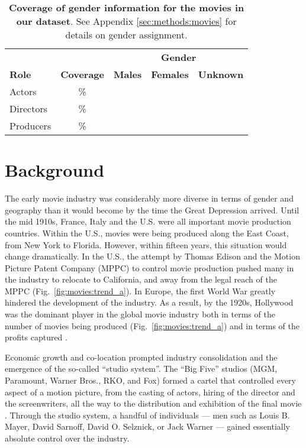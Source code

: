 \begin{table}[t]
\caption[Coverage of gender information for the movies in our dataset.]{\textbf{Coverage of gender information for the movies in our dataset}. See Appendix \ref{sec:methods:movies} for details on gender assignment.}
\label{tab:movies:data}
\begin{tabular}{lcrrr}
 ~   & ~              & \multicolumn{3}{c}{\textbf{Gender}} \\
\cmidrule{3-5}
\textbf{Role} & \textbf{Coverage} & \textbf{Males} & \textbf{Females} & \textbf{Unknown} \\
\midrule
Actors    & \actorCoverage{}\%  & \maleActors{}     & \femaleActors{}     & \naActors{}    \\
Directors & \dirCoverage{}\%    & \maleDirectors{}  & \femaleDirectors{}  & \naDirectors{} \\
Producers & \prodCoverage{}\%   & \maleProducers{}  & \femaleProducers{}  & \naProducers{} \\
\end{tabular}
\end{table}


\section{Background}

The early movie industry was considerably more diverse in terms of gender and geography than it would become by the time the Great Depression arrived. Until the mid 1910s, France, Italy and the U.S. were all important movie production countries. Within the U.S., movies were being produced along the East Coast, from New York to Florida. However, within fifteen years, this situation would change dramatically. In the U.S., the attempt by Thomas Edison and the Motion Picture Patent Company (MPPC) to control movie production pushed many in the industry to relocate to California, and away from the legal reach of the MPPC (Fig.~\ref{fig:movies:trend_a}). In Europe, the first World War greatly hindered the development of the industry. As a result, by the 1920s, Hollywood was the dominant player in the global movie industry both in terms of the number of movies being produced (Fig.~\ref{fig:movies:trend_a}) and in terms of the profits captured \cite{Scott2005}.

Economic growth and co-location prompted industry consolidation and the emergence of the so-called ``studio system''. The ``Big Five'' studios (MGM, Paramount, Warner Bros., RKO, and Fox) formed a cartel that controlled every aspect of a motion picture, from the casting of actors, hiring of the director and the screenwriters, all the way to the distribution and exhibition of the final movie \cite{Deutelbaum1989}. Through the studio system, a handful of individuals --- men such as Louis B. Mayer, David Sarnoff, David O. Selznick, or Jack Warner --- gained essentially absolute control over the industry.

